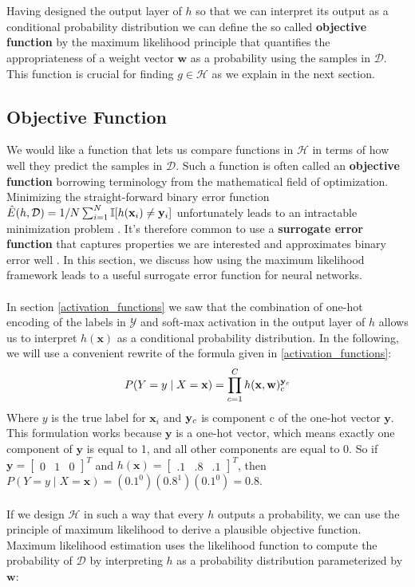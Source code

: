 \\\\
Having designed the output layer of $h$ so that we can interpret its output as a conditional probability distribution we can define the so called \textbf{objective function} by the maximum likelihood principle that quantifies the appropriateness of a weight vector $\mathbf{w}$ as a probability using the samples in $\mathcal{D}$. This function is crucial for finding $g \in \mathcal{H}$ as we explain in the next section.

\subsection{Objective Function}
\label{objectiveFunction}
We would like a function that lets us compare functions in $\mathcal{H}$ in terms of how well they predict the samples in $\mathcal{D}$. Such a function is often called an \textbf{objective function} borrowing terminology from the mathematical field of optimization. Minimizing the straight-forward binary error function $\hat{E}(h, \mathcal{D}) = 1/N \sum_{i=1}^N\mathbb{I}[h(\mathbf{x}_i) \neq \mathbf{y}_i]$ unfortunately leads to an intractable minimization problem \citep{marcotte1992}. It's therefore common to use a \textbf{surrogate error function} that captures properties we are interested and approximates binary error well \citep{goodfellow16}. In this section, we discuss how using the maximum likelihood framework leads to a useful surrogate error function for neural networks.
\\\\
In section \ref{activation_functions} we saw that the combination of one-hot encoding of the labels in $\mathcal{Y}$ and soft-max activation in the output layer of $h$ allows us to interpret $h(\mathbf{x})$ as a conditional probability distribution. In the following, we will use a convenient rewrite of the formula given in \ref{activation_functions}:
$$
P(Y = y \mid X = \mathbf{x}) = \prod\limits_{c=1}^C h(\mathbf{x},\mathbf{w})^{\mathbf{y}_c}_c
$$
Where $y$ is the true label for $\mathbf{x}_i$ and $\mathbf{y}_c$ is component c of the one-hot vector $\mathbf{y}$. 
This formulation works because $\mathbf{y}$ is a one-hot vector, which means exactly one component of $\mathbf{y}$ is equal to 1, and all other components are equal to 0. So if $\mathbf{y} = \begin{bmatrix}0 & 1 & 0 \end{bmatrix}^T$ and $h(\mathbf{x}) = \begin{bmatrix}.1 & .8 & .1 \end{bmatrix}^T$, then $P(Y = y \mid X = \mathbf{x}) = (0.1^0)(0.8^1)(0.1^0) = 0.8$.
\\\\
If we design $\mathcal{H}$ in such a way that every $h$ outputs a probability, we can use the principle of maximum likelihood to derive a plausible objective function. Maximum likelihood estimation uses the likelihood function to compute the probability of $\mathcal{D}$ by interpreting $h$ as a probability distribution parameterized by $\mathbf{w}$:

